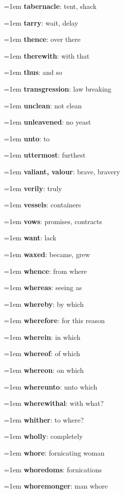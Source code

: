 {\begin{multicols}{3}
{\hangindent=1em \textbf{tabernacle}: tent, shack\par
\hangindent=1em \textbf{tarry}: wait, delay\par
\hangindent=1em \textbf{thence}: over there\par
\hangindent=1em \textbf{therewith}: with that\par
\hangindent=1em \textbf{thus}: and so\par
\hangindent=1em \textbf{transgression}: law breaking\par
\hangindent=1em \textbf{unclean}: not clean\par
\hangindent=1em \textbf{unleavened}: no yeast\par
\hangindent=1em \textbf{unto}: to\par
\hangindent=1em \textbf{uttermost}: furthest\par
\hangindent=1em \textbf{valiant, valour}: brave, bravery\par
\hangindent=1em \textbf{verily}: truly\par
\hangindent=1em \textbf{vessels}: containers\par
\hangindent=1em \textbf{vows}: promises, contracts\par
\hangindent=1em \textbf{want}: lack\par
\hangindent=1em \textbf{waxed}: became, grew\par
\hangindent=1em \textbf{whence}: from where\par
\hangindent=1em \textbf{whereas}: seeing as\par
\hangindent=1em \textbf{whereby}: by which\par
\hangindent=1em \textbf{wherefore}: for this reason\par
\hangindent=1em \textbf{wherein}: in which\par
\hangindent=1em \textbf{whereof}: of which\par
\hangindent=1em \textbf{whereon}: on which\par
\hangindent=1em \textbf{whereunto}: unto which\par
\hangindent=1em \textbf{wherewithal}: with what?\par
\hangindent=1em \textbf{whither}: to where?\par
\hangindent=1em \textbf{wholly}: completely\par
\hangindent=1em \textbf{whore}: fornicating woman\par
\hangindent=1em \textbf{whoredoms}: fornications\par
\hangindent=1em \textbf{whoremonger}: man whore\par
}
\end{multicols}}
